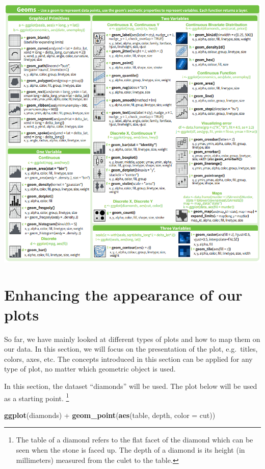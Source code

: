 \documentclass[]{tufte-book}
\newenvironment{Shaded}{}{}
\newcommand{\DataTypeTok}[1]{\textcolor[rgb]{0.56,0.13,0.00}{#1}}
\newcommand{\KeywordTok}[1]{\textcolor[rgb]{0.00,0.44,0.13}{\textbf{#1}}}
\newcommand{\NormalTok}[1]{#1}
\newcommand{\OperatorTok}[1]{\textcolor[rgb]{0.40,0.40,0.40}{#1}}
\newcommand{\StringTok}[1]{\textcolor[rgb]{0.25,0.44,0.63}{#1}}
\begin{document}
\includegraphics{images/geoms.PNG}

\hypertarget{enhancing-the-appearance-of-our-plots}{%
\section{Enhancing the appearance of our plots}\label{enhancing-the-appearance-of-our-plots}}

So far, we have mainly looked at different types of plots and how to map them on our data. In this section, we will focus on the presentation of the plot, e.g.~titles, colors, axes, etc. The concepts introduced in this section can be applied for any type of plot, no matter which geometric object is used.

In this section, the dataset ``diamonds'' will be used. The plot below will be used as a starting point. \footnote{The table of a diamond refers to the flat facet of the diamond which can be seen when the stone is faced up. The depth of a diamond is its height (in millimeters) measured from the culet to the table.}

\begin{Shaded}
\begin{Highlighting}[]
\KeywordTok{ggplot}\NormalTok{(diamonds) }\OperatorTok{+}
\StringTok{    }\KeywordTok{geom_point}\NormalTok{(}\KeywordTok{aes}\NormalTok{(table, depth, }\DataTypeTok{color =}\NormalTok{ cut))}
\end{Highlighting}
\end{Shaded}
\end{document}
